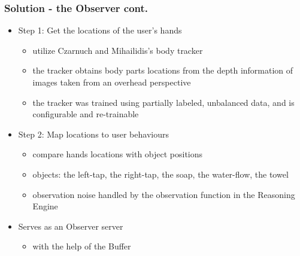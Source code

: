 \documentclass{beamer}
\begin{document}
\begin{frame}
\frametitle{Solution - the Observer cont.}
\begin{itemize}
\item Step 1: Get the locations of the user's hands
\begin{itemize}
\item utilize Czarnuch and Mihailidis's body tracker \cite{czarnuch2014}
\item the tracker obtains body parts locations from the depth information of images taken from an overhead perspective
\item the tracker was trained using partially labeled, unbalanced data, and is configurable and re-trainable
\end{itemize}
\item Step 2: Map locations to user behaviours
\begin{itemize}
\item compare hands locations with object positions
\item objects: the left-tap, the right-tap, the soap, the water-flow, the towel
\item observation noise handled by the observation function in the Reasoning Engine
\end{itemize}
\pause \item Serves as an Observer server
\begin{itemize}
\item with the help of the Buffer
\end{itemize}
\end{itemize}
\end{frame}
\end{document}
